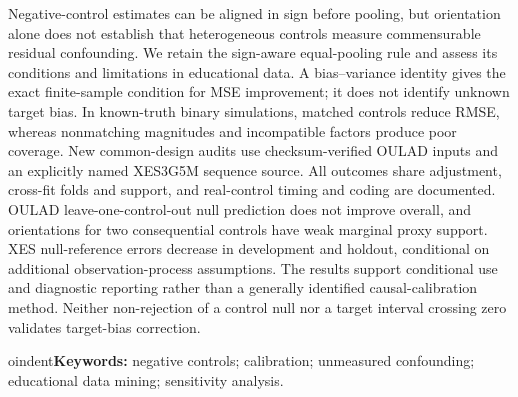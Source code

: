 Negative-control estimates can be aligned in sign before pooling, but orientation alone does not establish that heterogeneous controls measure commensurable residual confounding. We retain the sign-aware equal-pooling rule and assess its conditions and limitations in educational data. A bias--variance identity gives the exact finite-sample condition for MSE improvement; it does not identify unknown target bias. In known-truth binary simulations, matched controls reduce RMSE, whereas nonmatching magnitudes and incompatible factors produce poor coverage. New common-design audits use checksum-verified OULAD inputs and an explicitly named XES3G5M sequence source. All outcomes share adjustment, cross-fit folds and support, and real-control timing and coding are documented. OULAD leave-one-control-out null prediction does not improve overall, and orientations for two consequential controls have weak marginal proxy support. XES null-reference errors decrease in development and holdout, conditional on additional observation-process assumptions. The results support conditional use and diagnostic reporting rather than a generally identified causal-calibration method. Neither non-rejection of a control null nor a target interval crossing zero validates target-bias correction.


oindent\textbf{Keywords:} negative controls; calibration; unmeasured confounding; educational data mining; sensitivity analysis.
